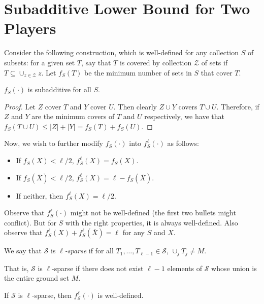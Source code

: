 \section{Subadditive Lower Bound for Two Players}
  Consider the following
  construction, which is well-defined for any collection $S$ of subsets: for a
  given set $T$, say that $T$ is covered by collection 
  $\mathcal Z$ of sets if $T\subseteq \cup_{z \in\mathcal Z} z$.
  Let $f_{S}(T)$ be the minimum number of sets in 
  $S$ that cover $T$. 

  \begin{lemma}
    $f_S(\cdot)$ is subadditive for all $S$.
  \end{lemma}
  \begin{proof}
    Let $Z$ cover $T$ and $Y$ cover $U$. Then clearly $Z \cup Y$ covers $T \cup
    U$. Therefore, if $Z$ and $Y$ are the minimum covers of $T$ and $U$
    respectively, we have that $f_S(T \cup U) \leq |Z|+|Y| = f_S(T) + f_S(U)$.
  \end{proof}

  Now, we wish to further modify $f_S(\cdot)$ into $f_S^\ell(\cdot)$ as follows:
  \begin{itemize} \item If $f_S(X) < \ell/2$, $f_S^\ell(X) = f_S(X)$.  \item If
      $f_S(\bar{X}) < \ell/2$, $f_S^\ell(X) = \ell - f_S(\bar{X})$.  \item If
        neither, then $f_S^\ell(X) = \ell/2$.  \end{itemize}

  Observe that $f_S^\ell(\cdot)$ might not be well-defined (the first two bullets
  might conflict). But for $S$ with the right properties, it is always
  well-defined. Also observe that $f^\ell_S(X) + f^\ell_S(\bar{X}) = \ell$
  for any $S$ and $X$.

  \begin{definition} We say that $\mathcal{S}$ is
  \emph{$\ell$-sparse} if for all $T_1,\ldots, T_{\ell-1} \in \mathcal{S}$,
  $\cup_j T_j \neq M$. \end{definition}
  That is, $\mathcal{S}$ is $\ell$-sparse if there
  does not exist $\ell-1$ elements of $\mathcal{S}$ whose union is the entire
  ground set $M$. 

  \begin{lemma} If $\mathcal{S}$ is $\ell$-sparse, then
  $f^\ell_\mathcal{S}(\cdot)$ is well-defined.  \end{lemma}

